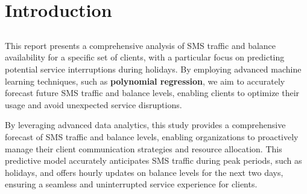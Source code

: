 \documentclass[12pt]{report} %
\begin{document}
\thispagestyle{empty}
\tableofcontents
\thispagestyle{empty}


\cleardoublepage
\clearpage




\setcounter{page}{1}
\thispagestyle{empty}
\listoffigures
\thispagestyle{empty}
\clearpage








\section*{Introduction}
\setcounter{page}{1}    %
\thispagestyle{empty}    %

\subsection*{}

This report presents a comprehensive analysis of SMS traffic and balance availability for a specific set of clients, with a particular focus on predicting potential service interruptions during holidays. By employing advanced machine learning techniques, such as \textbf{polynomial regression}, we aim to accurately forecast future SMS traffic and balance levels, enabling clients to optimize their usage and avoid unexpected service disruptions. 

By leveraging advanced data analytics, this study provides a comprehensive forecast of SMS traffic and balance levels, enabling organizations to proactively manage their client communication strategies and resource allocation. This predictive model accurately anticipates SMS traffic during peak periods, such as holidays, and offers hourly updates on balance levels for the next two days, ensuring a seamless and uninterrupted service experience for clients.
\end{document}
